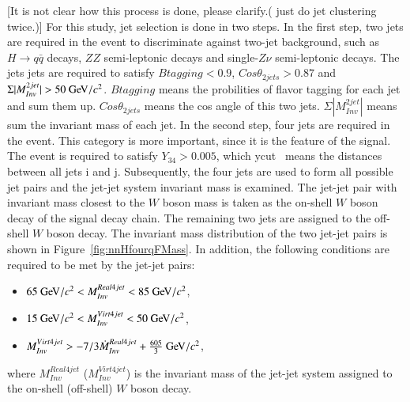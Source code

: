 \documentclass[11pt,a4paper]{cepcnote}
\begin{document}
{\color{red}[It is not clear how this process is done, please clarify.(\color{blue} just do jet clustering twice.)]}
For this study, jet selection is done in two steps. In the first step,
two jets are required in the event to discriminate against 
two-jet background, such as $H\rightarrow q\bar{q}$ decays, 
$ZZ$ semi-leptonic decays and single-$Z\nu$ semi-leptonic decays. 
The jets jets are required to satisfy $Btagging < 0.9$, 
$Cos\theta_{2jets} > 0.87$ and $\Sigma|M_{Inv}^{2jet}| > 50\gev/c^2$. 
{\color{blue} $Btagging$ means the probilities of flavor tagging for each jet and sum them up. 
$Cos\theta_{2jets} $ means the cos angle of this two jets.
$\Sigma|M_{Inv}^{2jet}|$ means sum the invariant mass of each jet.}
In the second step, four jets are required in the event. This category
is more important, since it is the feature of the signal. 
The event is required to satisfy  $Y_{34} > 0.005$, which ycut~\cite{Catani:1991hj} means the distances between all jets i and j.
Subsequently, the four jets are used to form all possible jet pairs and the
jet-jet system invariant mass is examined. The jet-jet pair with invariant
 mass closest to the $W$ boson mass is taken as the on-shell $W$ boson decay
of the signal decay chain. The remaining two jets are assigned to the
off-shell $W$ boson decay. The invariant mass distribution of the two
jet-jet pairs is shown in Figure~\ref{fig:nnHfourqFMass}.
In addition, the following conditions are required to be met by the jet-jet pairs:
\begin{itemize}
	\item $ 65\gev/c^2 < M_{Inv}^{Real4jet} < 85\gev/c^2$, 
	\item $ 15\gev/c^2 < M_{Inv}^{Virt4jet} < 50\gev/c^2$, 
	\item $ M_{Inv}^{Virt4jet} > -7/3\dot M_{Inv}^{Real4jet} + \frac{605}{3}\gev/c^2$,
\end{itemize}
where $M_{Inv}^{Real4jet}$  ($M_{Inv}^{Virt4jet}$) is the invariant mass of the jet-jet system assigned to the on-shell (off-shell) $W$ boson decay.
\end{document}
